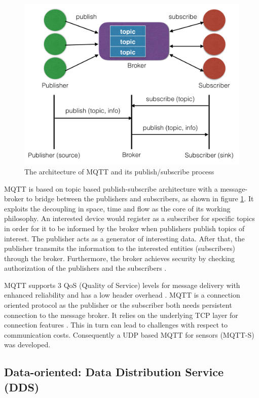 \begin{figure}[!htbp]
\centering
\includegraphics[scale = 0.55]{mqtt.png}
\caption{The architecture of MQTT and its publish/subscribe process}
\label{fig:mqtt}
\end{figure}

MQTT is based on topic based publish-subscribe architecture with a message-broker to bridge between the publishers and subscribers, as shown in figure \ref{fig:mqtt}. It exploits the decoupling in space, time and flow as the core of its working philosophy. An interested device would register as a subscriber for specific topics in order for it to be informed by the broker when publishers publish topics of interest. The publisher acts as a generator of interesting data. After that, the publisher transmits the information to the interested entities (subscribers) through the broker. Furthermore, the broker achieves security by checking authorization of the publishers and the subscribers \cite{4554519}\cite{6504105}.

MQTT supports 3 QoS (Quality of Service) levels for message delivery with enhanced reliability and has a low header overhead \cite{mqtt_protocol}. MQTT is a connection oriented protocol as the publisher or the subscriber both needs persistent connection to the message broker. It relies on the underlying TCP layer for connection features \cite{6504105}. This in turn can lead to challenges with respect to communication costs. Consequently a UDP based MQTT for sensors (MQTT-S) \cite{4554519} was developed.

\subsection{Data-oriented: Data Distribution Service (DDS)}

